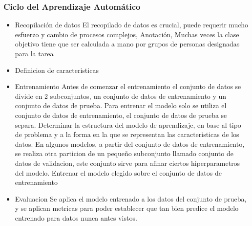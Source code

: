 \documentclass[a4paper,10pt]{article}
\begin{document}
\subsubsection{Ciclo del Aprendizaje Automático}
  \begin{itemize}
    \item Recopilación de datos
El recopilado de datos es crucial, puede requerir mucho esfuerzo y cambio de procesos complejos, 
Anotación, Muchas veces la clase objetivo tiene que ser calculada a mano por grupos de personas designadas para la tarea
\item Definicion de caracteristicas
\item Entrenamiento
Antes de comenzar el entrenamiento el conjunto de datos se divide en 2 subconjuntos, un conjunto de datos de entrenamiento y un conjunto de datos de prueba. 
Para entrenar el modelo solo se utiliza el conjunto de datos de entrenamiento, el conjunto de datos de prueba se separa.
Determinar la estructura del modelo de aprendizaje, en base al tipo de problema y a la forma en la que se representan las caracteristicas de los datos.
En algunos modelos, a partir del conjunto de datos de entrenamiento, se realiza otra particion de un pequeño subconjunto llamado conjunto de datos de validacion, este conjunto sirve 
para afinar ciertos hiperparametros del modelo.
Entrenar el modelo elegido sobre el conjunto de datos de entrenamiento
\item Evaluacion
Se aplica el modelo entrenado a los datos del conjunto de prueba, y se aplican metricas para poder establecer que tan bien predice el modelo entrenado para datos nunca antes vistos.
\end{itemize}
\end{document}
